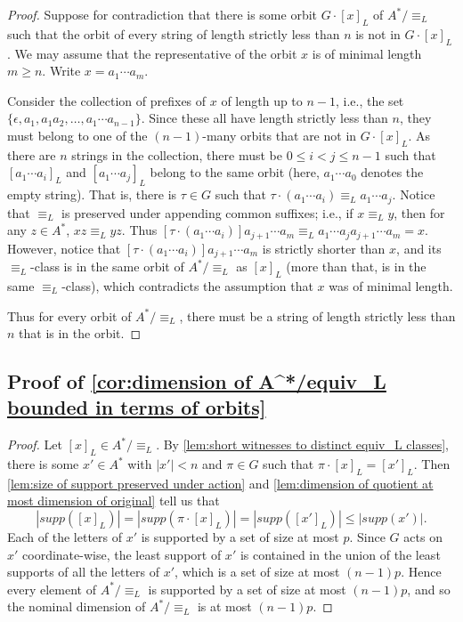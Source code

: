 \documentclass[runningheads]{llncs}
\begin{document}
\begin{proof}
    Suppose for contradiction that there is some orbit $G \cdot [x]_L$ of $A^* / \equiv_L$ such that the orbit of every string of length strictly less than $n$ is not in $G \cdot [x]_L$. 
    We may assume that the representative of the orbit $x$ is of minimal length $m \geq n$. 
    Write $x = a_1 \cdots a_m$. 

    Consider the collection of prefixes of $x$ of length up to $n-1$, i.e., the set $\{\epsilon, a_1, a_1 a_2, \ldots, a_1 \cdots a_{n-1}\}$.
    Since these all have length strictly less than $n$, they must belong to one of the $(n-1)$-many orbits that are not in $G \cdot [x]_L$. 
    As there are $n$ strings in the collection, there must be $0 \leq i < j \leq n-1$ such that $[a_1 \cdots a_i]_L$ and $[a_1 \cdots a_j]_L$ belong to the same orbit (here, $a_1 \cdots a_0$ denotes the empty string). 
    That is, there is $\tau \in G$ such that $\tau \cdot (a_1 \cdots a_i) \equiv_L a_1 \cdots a_j$. 
    Notice that $\equiv_L$ is preserved under appending common suffixes; i.e., if $x \equiv_L y$, then for any $z \in A^*$, $xz \equiv_L yz$. Thus $[\tau \cdot (a_1 \cdots a_i)] a_{j+1} \cdots a_m \equiv_L a_1 \cdots a_j a_{j+1} \cdots a_m = x$. 
    However, notice that $[\tau \cdot (a_1 \cdots a_i)] a_{j+1} \cdots a_m$ is strictly shorter than $x$, and its $\equiv_L$-class is in the same orbit of $A^* / \equiv_L$ as $[x]_L$ (more than that, is in the same $\equiv_L$-class), which contradicts the assumption that $x$ was of minimal length.

    Thus for every orbit of $A^* / \equiv_L$, there must be a string of length strictly less than $n$ that is in the orbit.
\end{proof}


\subsection{Proof of \autoref{cor:dimension of A^*/equiv_L bounded in terms of orbits}} \label{appendix:proof of dimension of A^*/equiv_L bounded in terms of orbits}

\begin{proof}
    Let $[x]_L \in A^* / \equiv_L$. 
    By \autoref{lem:short witnesses to distinct equiv_L classes}, there is some $x' \in A^*$ with $|x'| < n$ and $\pi \in G$ such that $\pi \cdot [x]_L = [x']_L$. 
    Then \autoref{lem:size of support preserved under action} and \autoref{lem:dimension of quotient at most dimension of original} tell us that 
    \[
        |supp([x]_L)| = |supp(\pi \cdot [x]_L)| = |supp([x']_L)| \leq |supp(x')|.
    \]
    Each of the letters of $x'$ is supported by a set of size at most $p$.
    Since $G$ acts on $x'$ coordinate-wise, the least support of $x'$ is contained in the union of the least supports of all the letters of $x'$, which is a set of size at most $(n-1)p$.
    Hence every element of $A^* / \equiv_L$ is supported by a set of size at most $(n-1)p$, and so the nominal dimension of $A^* / \equiv_L$ is at most $(n-1)p$.
\end{proof}

\fi
\end{document}
